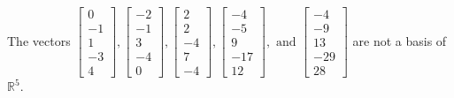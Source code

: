\begin{exercise}
\begin{exerciseStatement}
  \end{exerciseStatement}
  \begin{exerciseAnswer}
   The vectors \(\left[\begin{array}{r}
0 \\
-1 \\
1 \\
-3 \\
4
\end{array}\right] , \left[\begin{array}{r}
-2 \\
-1 \\
3 \\
-4 \\
0
\end{array}\right] , \left[\begin{array}{r}
2 \\
2 \\
-4 \\
7 \\
-4
\end{array}\right] , \left[\begin{array}{r}
-4 \\
-5 \\
9 \\
-17 \\
12
\end{array}\right] , \text{ and } \left[\begin{array}{r}
-4 \\
-9 \\
13 \\
-29 \\
28
\end{array}\right]\) 
  	 are not  a basis of \(\mathbb{R}^5\).
  


  \end{exerciseAnswer}
\end{exercise}